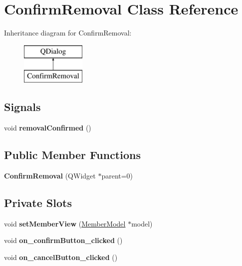 \hypertarget{class_confirm_removal}{}\section{Confirm\+Removal Class Reference}
\label{class_confirm_removal}
Inheritance diagram for Confirm\+Removal\+:\begin{figure}[H]
\begin{center}
\leavevmode
\includegraphics[height=2.000000cm]{class_confirm_removal}
\end{center}
\end{figure}
\subsection*{Signals}
\begin{DoxyCompactItemize}
\item 
\mbox{\label{class_confirm_removal_a76aeed50b8cde86b01e23141e265385d}} 
void {\bfseries removal\+Confirmed} ()
\end{DoxyCompactItemize}
\subsection*{Public Member Functions}
\begin{DoxyCompactItemize}
\item 
\mbox{\label{class_confirm_removal_a93632c6ffbc8e0a45d4516f4e1387138}} 
{\bfseries Confirm\+Removal} (Q\+Widget $\ast$parent=0)
\end{DoxyCompactItemize}
\subsection*{Private Slots}
\begin{DoxyCompactItemize}
\item 
\mbox{\label{class_confirm_removal_aa00e7fff6cdcf320b9f5768946ddc3cf}} 
void {\bfseries set\+Member\+View} (\mbox{\hyperlink{class_member_model}{Member\+Model}} $\ast$model)
\item 
\mbox{\label{class_confirm_removal_a1a9bf06a4b5c7871eae10b86d181bb85}} 
void {\bfseries on\+\_\+confirm\+Button\+\_\+clicked} ()
\item 
\mbox{\label{class_confirm_removal_a7fa598205beee92035213e06bd8e8a7a}} 
void {\bfseries on\+\_\+cancel\+Button\+\_\+clicked} ()
\end{DoxyCompactItemize}
